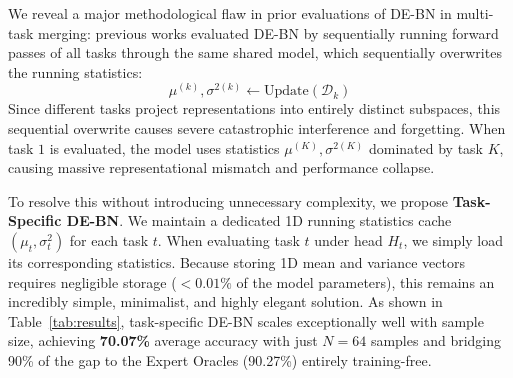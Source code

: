 \documentclass{article}
\begin{document}
We reveal a major methodological flaw in prior evaluations of DE-BN in multi-task merging: previous works evaluated DE-BN by sequentially running forward passes of all tasks through the same shared model, which sequentially overwrites the running statistics:
\begin{equation}
    \mu^{(k)}, \sigma^{2(k)} \leftarrow \text{Update}\left(\mathcal{D}_k\right)
\end{equation}
Since different tasks project representations into entirely distinct subspaces, this sequential overwrite causes severe catastrophic interference and forgetting. When task $1$ is evaluated, the model uses statistics $\mu^{(K)}, \sigma^{2(K)}$ dominated by task $K$, causing massive representational mismatch and performance collapse.

To resolve this without introducing unnecessary complexity, we propose \textbf{Task-Specific DE-BN}. We maintain a dedicated 1D running statistics cache $(\mu_t, \sigma^2_t)$ for each task $t$. When evaluating task $t$ under head $H_t$, we simply load its corresponding statistics. Because storing 1D mean and variance vectors requires negligible storage ($<0.01\%$ of the model parameters), this remains an incredibly simple, minimalist, and highly elegant solution. As shown in Table~\ref{tab:results}, task-specific DE-BN scales exceptionally well with sample size, achieving \textbf{70.07\%} average accuracy with just $N=64$ samples and bridging 90\% of the gap to the Expert Oracles (90.27\%) entirely training-free.
\end{document}
